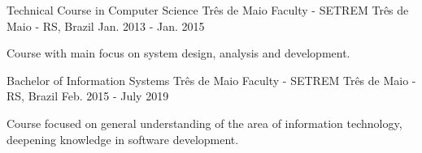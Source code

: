 
\begin{cventries}
  \cventry
  {Technical Course in Computer Science} %
  {Três de Maio Faculty - SETREM} %
  {Três de Maio - RS, Brazil} %
  {Jan. 2013 - Jan. 2015} %
  {
    \begin{cvitems} %
      \item {Course with main focus on system design, analysis and development.}
    \end{cvitems}
  }

  \cventry
  {Bachelor of Information Systems} %
  {Três de Maio Faculty - SETREM} %
  {Três de Maio - RS, Brazil} %
  {Feb. 2015 - July 2019} %
  {
    \begin{cvitems} %
      \item {Course focused on general understanding of the area of information technology,\\deepening knowledge in software development.}
    \end{cvitems}
  }
\end{cventries}
